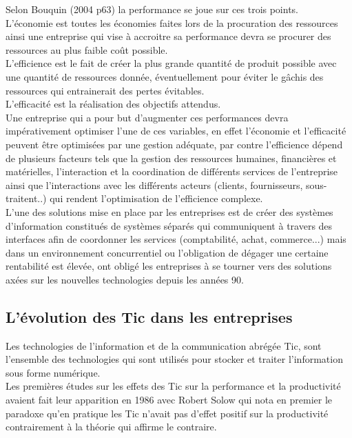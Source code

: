        Selon Bouquin (2004 p63) la performance se joue sur ces trois points.\\

        L’économie est toutes les économies faites lors de la procuration des ressources ainsi une entreprise qui vise à accroitre sa performance devra se procurer des ressources au plus faible coût possible.\\

        L’efficience est le fait de créer la plus grande quantité de produit possible avec une quantité de ressources donnée, éventuellement pour éviter le gâchis des ressources qui entrainerait des pertes évitables.\\

        L’efficacité est la réalisation des objectifs attendus. \\

        Une entreprise qui a pour but d’augmenter ces performances devra impérativement optimiser l’une de ces variables, en effet l’économie et l’efficacité peuvent être optimisées par une gestion adéquate, par contre l’efficience dépend de plusieurs facteurs tels que la gestion des ressources humaines, financières et matérielles, l’interaction et la coordination de différents services de l’entreprise ainsi que l’interactions avec les différents acteurs (clients, fournisseurs, sous-traitent..) qui rendent l’optimisation de l’efficience complexe.\\

        L’une des solutions mise en place par les entreprises est de créer des systèmes d’information constitués de systèmes séparés qui communiquent à travers des interfaces afin de coordonner les services (comptabilité, achat, commerce...) mais dans un environnement concurrentiel ou l’obligation de dégager une certaine rentabilité est élevée, ont obligé les entreprises à se tourner vers des solutions axées sur les nouvelles technologies depuis les années 90.

    \subsection{L’évolution des Tic dans les entreprises}
        Les technologies de l’information et de la communication abrégée Tic, sont l’ensemble des technologies qui sont utilisés pour stocker et traiter l’information sous forme numérique.\\

        Les premières études sur les effets des Tic sur la performance et la productivité avaient fait leur apparition en 1986 avec Robert Solow qui nota en premier le paradoxe qu’en pratique les Tic n’avait pas d’effet positif sur la productivité contrairement à la théorie qui affirme le contraire.\\

